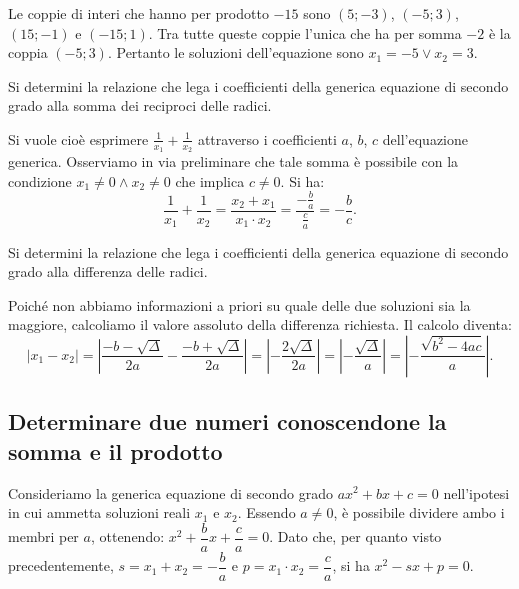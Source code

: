 \begin{exrig}
\begin{esempio}
Le coppie di interi che hanno per prodotto $-15$ sono $(5;-3)$, $(-5;3)$, $(15;-1)$ e $(-15;1)$. Tra tutte queste coppie l'unica che ha per somma $-2$ è la coppia $(-5;3)$.
Pertanto le soluzioni dell'equazione sono $x_{1} = -5 \vee x_{2} = 3$.
\end{esempio}

\begin{esempio}
Si determini la relazione che lega i coefficienti della generica equazione di secondo grado alla somma dei reciproci delle radici.

Si vuole cioè esprimere $\frac{1}{x_{1}} + \frac{1}{x_{2}}$ attraverso i coefficienti $a$, $b$, $c$ dell'equazione generica. Osserviamo in via preliminare che tale somma è possibile con la condizione $x_{1} \neq 0 \wedge x_{2} \neq 0$ che implica $c \neq 0$. Si ha: 
\[\frac{1}{x_{1}} + \frac{1}{x_{2}} = \frac{x_{2} + x_{1}}{x
_{1} \cdot x_{2}} = \frac{- \frac{b}{a}}{\frac{c}{a}} = - \frac{b}{c}.\]
\end{esempio}

\begin{esempio}
Si determini la relazione che lega i coefficienti della generica equazione di secondo grado alla differenza delle radici.

Poiché non abbiamo informazioni a priori su quale delle due soluzioni sia la maggiore, calcoliamo il valore assoluto della differenza richiesta. Il calcolo diventa: \[
\left\lvert x_{1} - x_{2} \right\rvert = \left\lvert \frac{- b -\sqrt{\Delta}}{2 a} - \frac{- b + \sqrt{\Delta}}{2 a} \right\rvert =\left\lvert - \frac{2 \sqrt{\Delta}}{2 a} \right\rvert = \left\lvert -\frac{\sqrt{\Delta}}{a} \right\rvert = \left\lvert -\frac{\sqrt{b^2-4ac}}{a} \right\rvert.
\]
\end{esempio}
\end{exrig}
\vspazio\ovalbox{\risolvii \ref{ese:3.67}, \ref{ese:3.68}, \ref{ese:3.69}, \ref{ese:3.70}, \ref{ese:3.71}, \ref{ese:3.72}, \ref{ese:3.73}, \ref{ese:3.74}, \ref{ese:3.75}, \ref{ese:3.76}}

\subsection{Determinare due numeri conoscendone la somma e il prodotto}

Consideriamo la generica equazione di secondo grado $a x^{2} + bx + c = 0$ nell'ipotesi in cui ammetta soluzioni reali $x_{1}$ e $x_{2}$. Essendo $a \neq 0$, è possibile dividere ambo i membri per $a$, ottenendo: $x^{2} + \dfrac{b}{a} x + \dfrac{c}{a} = 0$. Dato che, per quanto visto precedentemente, $s = x_{1} + x_{2} = - \dfrac{b}{a}$ e $p = x_{1} \cdot x_{2} = \dfrac{c}{a}$, si ha $x^{2} - s x + p = 0$.

